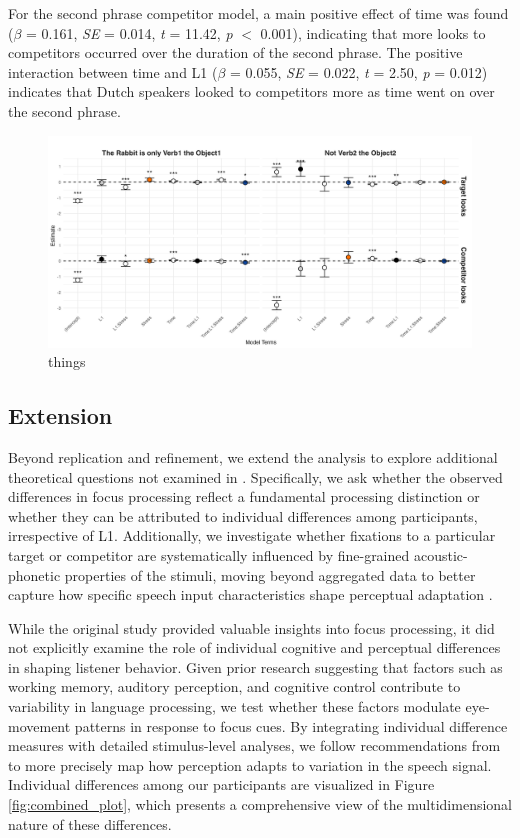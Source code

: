 For the second phrase competitor model, a main positive effect of time was found ($\beta$ = 0.161, \textit{SE} = 0.014, \textit{t} = 11.42, \textit{p} $<$ 0.001), indicating that more looks to competitors occurred over the duration of the second phrase. The positive interaction between time and L1 ($\beta$ = 0.055, \textit{SE} = 0.022, \textit{t} = 2.50, \textit{p} = 0.012) indicates that Dutch speakers looked to competitors more as time went on over the second phrase. 

\begin{figure}[H]  %
    \centering
    \includegraphics[width=\textwidth,height=\textheight,keepaspectratio]{viz/gam_mod_out.png}
    \caption{things}
    \label{fig:gam_mod_out}
\end{figure}

\subsection{Extension}

Beyond replication and refinement, we extend the analysis to explore additional theoretical questions not examined in \cite{Ge2021}. Specifically, we ask whether the observed differences in focus processing reflect a fundamental processing distinction or whether they can be attributed to individual differences among participants, irrespective of L1. Additionally, we investigate whether fixations to a particular target or competitor are systematically influenced by fine-grained acoustic-phonetic properties of the stimuli, moving beyond aggregated data to better capture how specific speech input characteristics shape perceptual adaptation \citep{xie2023adaptive}.

While the original study provided valuable insights into focus processing, it did not explicitly examine the role of individual cognitive and perceptual differences in shaping listener behavior. Given prior research suggesting that factors such as working memory, auditory perception, and cognitive control contribute to variability in language processing, we test whether these factors modulate eye-movement patterns in response to focus cues. By integrating individual difference measures with detailed stimulus-level analyses, we follow recommendations from \cite{xie2023adaptive} to more precisely map how perception adapts to variation in the speech signal. Individual differences among our participants are visualized in Figure \ref{fig:combined_plot}, which presents a comprehensive view of the multidimensional nature of these differences. 

